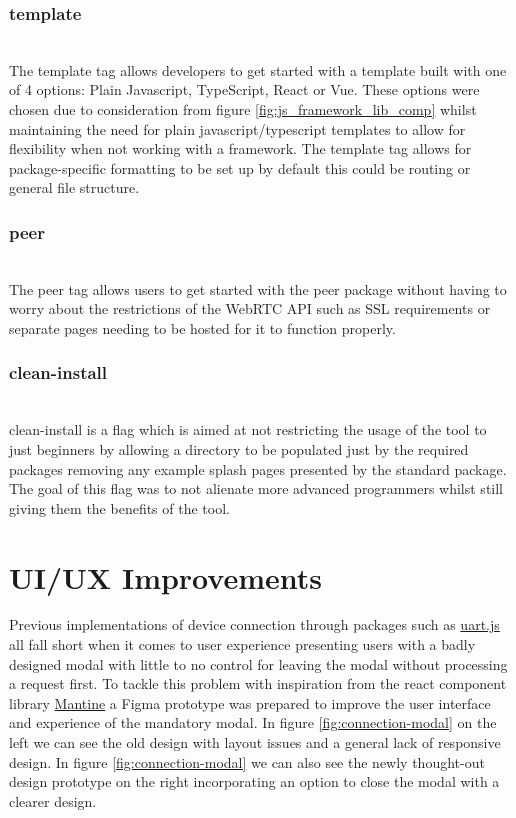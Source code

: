\documentclass{l4proj}
\begin{document}
\subsubsection{template}\hfill\\
The template tag allows developers to get started with a template built with one of 4 options: Plain Javascript, TypeScript, React or Vue. These options were chosen due to consideration from figure \ref{fig:js_framework_lib_comp} whilst maintaining the need for plain javascript/typescript templates to allow for flexibility when not working with a framework. The template tag allows for package-specific formatting to be set up by default this could be routing or general file structure.



\subsubsection{peer}\hfill\\
The peer tag allows users to get started with the peer package without having to worry about the restrictions of the WebRTC API such as SSL requirements or separate pages needing to be hosted for it to function properly.



\subsubsection{clean-install}\hfill\\
clean-install is a flag which is aimed at not restricting the usage of the tool to just beginners by allowing a directory to be populated just by the required packages removing any example splash pages presented by the standard package. The goal of this flag was to not alienate more advanced programmers whilst still giving them the benefits of the tool.

\section{UI/UX Improvements}
Previous implementations of device connection through packages such as \href{https://www.espruino.com/UART.js}{uart.js} all fall short when it comes to user experience presenting users with a badly designed modal with little to no control for leaving the modal without processing a request first. To tackle this problem with inspiration from the react component library \href{https://mantine.dev/}{Mantine} a Figma prototype was prepared to improve the user interface and experience of the mandatory modal. In figure \ref{fig:connection-modal} on the left we can see the old design with layout issues and a general lack of responsive design. In figure \ref{fig:connection-modal} we can also see the newly thought-out design prototype on the right incorporating an option to close the modal with a clearer design. 
\end{document}
